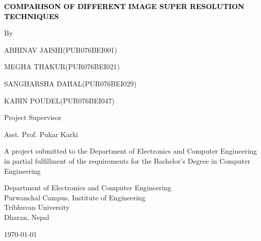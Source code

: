 \newpage
{}
\begin{titlepage}
    \centering
{\fontsize{12pt}{14pt}\bfseries\textcolor{black}{COMPARISON OF DIFFERENT IMAGE SUPER RESOLUTION TECHNIQUES}\par}
\vspace{2.0cm}
       {By} \par {ABHINAV JAISHI}({PUR076BEI001})
            \par {MEGHA THAKUR}({PUR076BEI021})
            \par {SANGHARSHA DAHAL}({PUR076BEI029})
            \par {KABIN POUDEL}({PUR076BEI047})
       \vspace{2.0cm}\par
    Project Supervisor\par
    Asst. Prof. Pukar Karki\par
    \vspace{2.0cm}
    {A project submitted to the Department of Electronics and Computer Engineering in partial fulfillment of the requirements for the Bachelor’s Degree in Computer Engineering}\par
        \vspace{2.0cm}\par

    {Department of Electronics and Computer Engineering\\ Purwanchal Campus, Institute of Engineering \\ Tribhuvan University\\ Dharan, Nepal}\par
        \vspace{2.0cm}\par
        
        \today
\end{titlepage}
